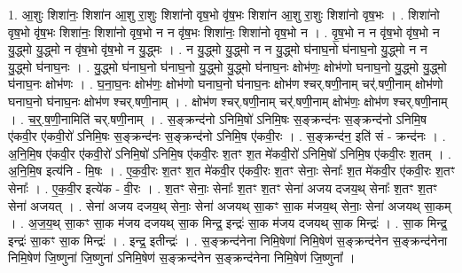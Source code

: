 \documentclass[17pt]{extarticle}
\begin{document}
1. आ॒शुः शिशा॑नः॒ शिशा॑न आ॒शु रा॒शुः शिशा॑नो वृष॒भो वृ॑ष॒भः शिशा॑न आ॒शु रा॒शुः शिशा॑नो वृष॒भः । . शिशा॑नो वृष॒भो वृ॑ष॒भः शिशा॑नः॒ शिशा॑नो वृष॒भो न न वृ॑ष॒भः शिशा॑नः॒ शिशा॑नो वृष॒भो न । . वृ॒ष॒भो न न वृ॑ष॒भो वृ॑ष॒भो न यु॒द्ध्मो यु॒द्ध्मो न वृ॑ष॒भो वृ॑ष॒भो न यु॒द्ध्मः । . न यु॒द्ध्मो यु॒द्ध्मो न न यु॒द्ध्मो घ॑नाघ॒नो घ॑नाघ॒नो यु॒द्ध्मो न न यु॒द्ध्मो घ॑नाघ॒नः । . यु॒द्ध्मो घ॑नाघ॒नो घ॑नाघ॒नो यु॒द्ध्मो यु॒द्ध्मो घ॑नाघ॒नः क्षोभ॑णः॒ क्षोभ॑णो घनाघ॒नो यु॒द्ध्मो यु॒द्ध्मो घ॑नाघ॒नः क्षोभ॑णः । . घ॒ना॒घ॒नः क्षोभ॑णः॒ क्षोभ॑णो घनाघ॒नो घ॑नाघ॒नः क्षोभ॑ण श्चर्.षणी॒नाम् चर्॑.षणी॒नाम् क्षोभ॑णो घनाघ॒नो घ॑नाघ॒नः क्षोभ॑ण श्चर्.षणी॒नाम् । . क्षोभ॑ण श्चर्.षणी॒नाम् चर्॑.षणी॒नाम् क्षोभ॑णः॒ क्षोभ॑ण श्चर्.षणी॒नाम् । . च॒र्॒.ष॒णी॒नामिति॑ चर्.षणी॒नाम् । . स॒ङ्क्रन्द॑नो ऽनिमि॒षो॑ ऽनिमि॒षः स॒ङ्क्रन्द॑नः स॒ङ्क्रन्द॑नो ऽनिमि॒ष ए॑कवी॒र ए॑कवी॒रो॑ ऽनिमि॒षः स॒ङ्क्रन्द॑नः स॒ङ्क्रन्द॑नो ऽनिमि॒ष ए॑कवी॒रः । . स॒ङ्क्रन्द॑न॒ इति॑ सं - क्रन्द॑नः । . अ॒नि॒मि॒ष ए॑कवी॒र ए॑कवी॒रो॑ ऽनिमि॒षो॑ ऽनिमि॒ष ए॑कवी॒रः श॒तꣳ श॒त मे॑कवी॒रो॑ ऽनिमि॒षो॑ ऽनिमि॒ष ए॑कवी॒रः श॒तम् । . अ॒नि॒मि॒ष इत्य॑नि - मि॒षः । . ए॒क॒वी॒रः श॒तꣳ श॒त मे॑कवी॒र ए॑कवी॒रः श॒तꣳ सेनाः॒ सेनाः᳚ श॒त मे॑कवी॒र ए॑कवी॒रः श॒तꣳ सेनाः᳚ । . ए॒क॒वी॒र इत्ये॑क - वी॒रः । . श॒तꣳ सेनाः॒ सेनाः᳚ श॒तꣳ श॒तꣳ सेना॑ अजय दजय॒थ् सेनाः᳚ श॒तꣳ श॒तꣳ सेना॑ अजयत् । . सेना॑ अजय दजय॒थ् सेनाः॒ सेना॑ अजयथ् सा॒कꣳ सा॒क म॑जय॒थ् सेनाः॒ सेना॑ अजयथ् सा॒कम् । . अ॒ज॒य॒थ् सा॒कꣳ सा॒क म॑जय दजयथ् सा॒क मिन्द्र॒ इन्द्रः॑ सा॒क म॑जय दजयथ् सा॒क मिन्द्रः॑ । . सा॒क मिन्द्र॒ इन्द्रः॑ सा॒कꣳ सा॒क मिन्द्रः॑ । . इन्द्र॒ इतीन्द्रः॑ । . स॒ङ्क्रन्द॑नेना निमि॒षेणा॑ निमि॒षेण॑ स॒ङ्क्रन्द॑नेन स॒ङ्क्रन्द॑नेना निमि॒षेण॑ जि॒ष्णुना॑ जि॒ष्णुना॑ ऽनिमि॒षेण॑ स॒ङ्क्रन्द॑नेन स॒ङ्क्रन्द॑नेना निमि॒षेण॑ जि॒ष्णुना᳚ । \newline
\end{document}
